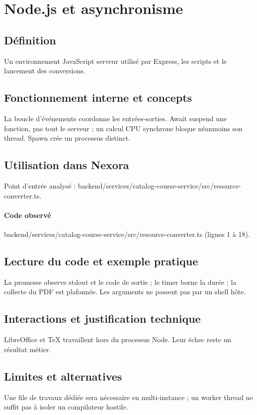 \section{Node.js et asynchronisme}
\subsection*{Définition}
Un environnement JavaScript serveur utilisé par Express, les scripts et le lancement des conversions.

\subsection*{Fonctionnement interne et concepts}
La boucle d’événements coordonne les entrées-sorties. Await suspend une fonction, pas tout le serveur ; un calcul CPU synchrone bloque néanmoins son thread. Spawn crée un processus distinct.

\subsection*{Utilisation dans Nexora}
Point d’entrée analysé : backend/services/catalog-course-service/src/resource-converter.ts.

\paragraph{Code observé} backend/services/catalog-course-service/src/resource-converter.ts (lignes 1 à 18).

\subsection*{Lecture du code et exemple pratique}
La promesse observe stdout et le code de sortie ; le timer borne la durée ; la collecte du PDF est plafonnée. Les arguments ne passent pas par un shell hôte.

\subsection*{Interactions et justification technique}
LibreOffice et TeX travaillent hors du processus Node. Leur échec reste un résultat métier.

\subsection*{Limites et alternatives}
Une file de travaux dédiée sera nécessaire en multi-instance ; un worker thread ne suffit pas à isoler un compilateur hostile.


